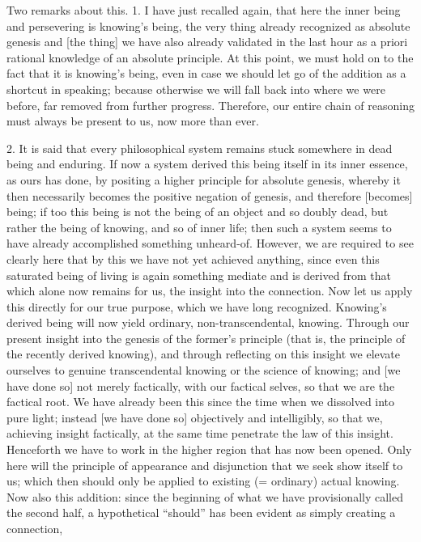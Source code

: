 Two remarks about this.
1. I have just recalled again,
that here the inner being and persevering is knowing's being,
the very thing already recognized as absolute genesis
and [the thing] we have also already validated in the last hour
as a priori rational knowledge of an absolute principle.
At this point, we must hold on to
the fact that it is knowing's being,
even in case we should let go of
the addition as a shortcut in speaking;
because otherwise we will fall back into
where we were before, far removed from further progress.
Therefore, our entire chain of reasoning
must always be present to us, now more than ever.

2. It is said that every philosophical system
remains stuck somewhere in dead being and enduring.
If now a system derived this being itself in its inner essence,
as ours has done, by positing
a higher principle for absolute genesis,
whereby it then necessarily becomes
the positive negation of genesis,
and therefore [becomes] being;
if too this being is not the being of an object and so doubly dead,
but rather the being of knowing, and so of inner life;
then such a system seems to have already
accomplished something unheard-of.
However, we are required to see clearly here that
by this we have not yet achieved anything,
since even this saturated being of living is
again something mediate
and is derived from that
which alone now remains for us,
the insight into the connection.
Now let us apply this directly for our true purpose,
which we have long recognized.
Knowing's derived being will now yield
ordinary, non-transcendental, knowing.
Through our present insight into
the genesis of the former's principle
(that is, the principle of the recently derived knowing),
and through reflecting on this insight
we elevate ourselves to genuine transcendental knowing
or the science of knowing;
and [we have done so] not merely factically,
with our factical selves,
so that we are the factical root.
We have already been this since
the time when we dissolved into pure light;
instead [we have done so] objectively and intelligibly,
so that we, achieving insight factically,
at the same time penetrate the law of this insight.
Henceforth we have to work in the higher region
that has now been opened.
Only here will the principle of
appearance and disjunction
that we seek show itself to us;
which then should only be applied to
existing (= ordinary) actual knowing.
Now also this addition:
since the beginning of what we
have provisionally called the second half,
a hypothetical “should” has been evident
as simply creating a connection,
